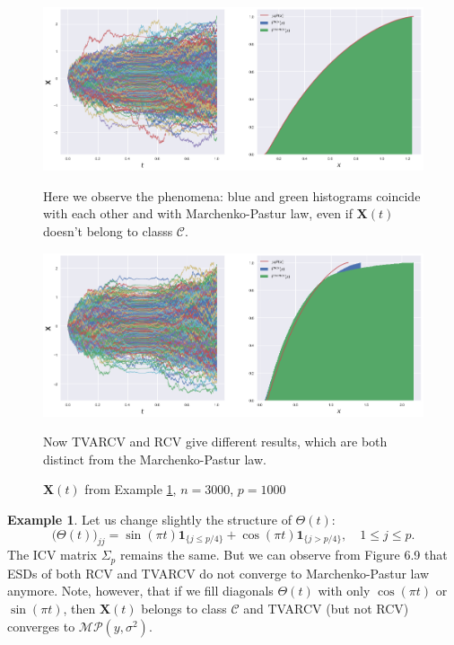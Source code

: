 \documentclass[a4paper,11pt]{book}
\theoremstyle{plain}
\theoremstyle{definition}
\newtheorem{exmp}[thm]{Example}
\begin{document}
    \begin{figure}
    	\begin{center} \centering
    		\includegraphics[scale=0.4]{counter}
    		\caption{ $\mathbf{X}(t)$ from Example \ref{counter exmpl}, $n = 3000$, $p=1000$ }
    		\smallskip
    		\small
    		Here we observe the phenomena: blue and green histograms coincide with each other and with Marchenko-Pastur law, even if $\mathbf{X}(t)$ doesn't belong to classs $\mathcal{C}$.
    	\end{center}
    	\begin{center} \centering
    		\includegraphics[scale=0.4]{counter2}
    		\caption{ $\mathbf{X}(t)$ from Example \ref{counter exmpl2}, $n = 3000$, $p=1000$ }
    		\smallskip
    		\small
    		Now TVARCV and RCV give different results, which are both distinct from the Marchenko-Pastur law.
    	\end{center}
    \end{figure}
    
    \begin{exmp} \label{counter exmpl2}
    	Let us change slightly the structure of $\Theta(t)$:
    	\[ \Big(\Theta(t)\Big)_{jj} = \sin(\pi t) \mathbf{1}_{\{j \leq p/4\}} + \cos(\pi t) \mathbf{1}_{\{j > p/4\}}, \quad 1 \leq j \leq p.\]
    	The ICV matrix $\Sigma_p$ remains the same. But we can observe from Figure 6.9 that ESDs of both RCV and TVARCV do not converge to Marchenko-Pastur law anymore. Note, however, that if we fill diagonals $\Theta(t)$ with only $\cos(\pi t)$ or $\sin(\pi t)$, then $\mathbf{X}(t)$ belongs to class $\mathcal{C}$ and TVARCV (but not RCV) converges to $\mathcal{MP}(y, \sigma^2)$.
    \end{exmp}
    
\end{document}
